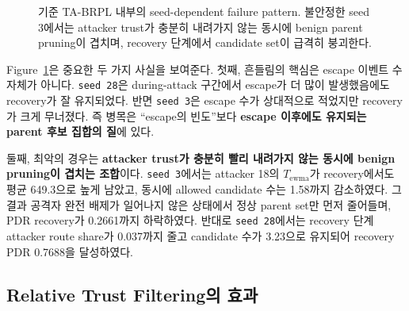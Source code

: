 \documentclass[12pt,a4paper]{article}
\begin{document}
\begin{figure}[t]
  \centering
  \caption{기준 TA-BRPL 내부의 seed-dependent failure pattern. 불안정한 seed 3에서는
  attacker trust가 충분히 내려가지 않는 동시에 benign parent pruning이 겹치며,
  recovery 단계에서 candidate set이 급격히 붕괴한다.}
  \label{fig:seed3-vs-28}
\end{figure}

Figure~\ref{fig:seed3-vs-28}은 중요한 두 가지 사실을 보여준다.
첫째, 흔들림의 핵심은 escape 이벤트 수 자체가 아니다.
\texttt{seed 28}은 during-attack 구간에서 escape가 더 많이 발생했음에도 recovery가 잘 유지되었다.
반면 \texttt{seed 3}은 escape 수가 상대적으로 적었지만 recovery가 크게 무너졌다.
즉 병목은 ``escape의 빈도''보다 \textbf{escape 이후에도 유지되는 parent 후보 집합의 질}에 있다.

둘째, 최악의 경우는 \textbf{attacker trust가 충분히 빨리 내려가지 않는 동시에 benign pruning이 겹치는 조합}이다.
\texttt{seed 3}에서는 attacker 18의 $T_\text{ewma}$가 recovery에서도 평균 649.3으로 높게 남았고,
동시에 allowed candidate 수는 1.58까지 감소하였다.
그 결과 공격자 완전 배제가 일어나지 않은 상태에서 정상 parent set만 먼저 줄어들며,
PDR recovery가 0.2661까지 하락하였다.
반대로 \texttt{seed 28}에서는 recovery 단계 attacker route share가 0.037까지 줄고
candidate 수가 3.23으로 유지되어 recovery PDR 0.7688을 달성하였다.

\subsection{Relative Trust Filtering의 효과}
\end{document}
